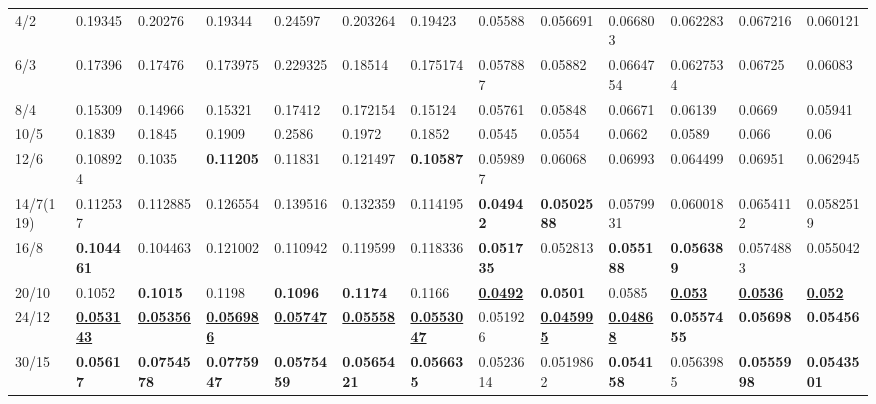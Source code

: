 \begin{landscape}
\begin{table}[]
{\begin{tabular}{@{}lllllllllllll@{}}
4/2 & 0.19345 & 0.20276 & 0.19344 & 0.24597 & 0.203264 & 0.19423 & 0.05588 & 0.056691 & 0.066803 & 0.062283 & 0.067216 & 0.060121 \\
6/3 & 0.17396 & 0.17476 & 0.173975 & 0.229325 & 0.18514 & 0.175174 & 0.057887 & 0.05882 & 0.0664754 & 0.0627534 & 0.06725 & 0.06083 \\
8/4 & 0.15309 & 0.14966 & 0.15321 & 0.17412 & 0.172154 & 0.15124 & 0.05761 & 0.05848 & 0.06671 & 0.06139 & 0.0669 & 0.05941 \\
10/5 & 0.1839 & 0.1845 & 0.1909 & 0.2586 & 0.1972 & 0.1852 & 0.0545 & 0.0554 & 0.0662 & 0.0589 & 0.066 & 0.06 \\
12/6 & 0.108924 & 0.1035 & {\color[HTML]{34FF34} \textbf{0.11205}} & 0.11831 & 0.121497 & {\color[HTML]{34FF34} \textbf{0.10587}} & 0.059897 & 0.06068 & 0.06993 & 0.064499 & 0.06951 & 0.062945 \\
14/7(119\textendash0) & 0.112537 & 0.112885 & 0.126554 & 0.139516 & 0.132359 & 0.114195 & {\color[HTML]{32CB00} \textbf{0.04942}} & {\color[HTML]{34FF34} \textbf{0.0502588}} & 0.0579931 & 0.060018 & 0.0654112 & 0.0582519 \\
16/8 & {\color[HTML]{34FF34} \textbf{0.104461}} & 0.104463 & 0.121002 & 0.110942 & 0.119599 & 0.118336 & {\color[HTML]{34FF34} \textbf{0.051735}} & 0.052813 & {\color[HTML]{34FF34} \textbf{0.055188}} & {\color[HTML]{34FF34} \textbf{0.056389}} & 0.0574883 & 0.055042 \\
20/10 & 0.1052 & {\color[HTML]{34FF34} \textbf{0.1015}} & 0.1198 & {\color[HTML]{34FF34} \textbf{0.1096}} & {\color[HTML]{34FF34} \textbf{0.1174}} & 0.1166 & {\color[HTML]{009901} {\ul\textbf{0.0492}}} & {\color[HTML]{32CB00} \textbf{0.0501}} & 0.0585 & {\color[HTML]{009901} {\ul\textbf{0.053}}} & {\color[HTML]{009901} {\ul\textbf{0.0536}}} & {\color[HTML]{009901} {\ul\textbf{0.052}}} \\
24/12 & {\color[HTML]{009901} {\ul\textbf{0.053143}}} & {\color[HTML]{009901} {\ul\textbf{0.05356}}} & {\color[HTML]{009901} {\ul\textbf{0.056986}}} & {\color[HTML]{009901} {\ul\textbf{0.05747}}} & {\color[HTML]{009901} {\ul\textbf{0.05558}}} & {\color[HTML]{009901} {\ul\textbf{0.0553047}}} & 0.051926 & {\color[HTML]{009901} {\ul\textbf{0.045995}}} & {\color[HTML]{009901} {\ul\textbf{0.04868}}} & {\color[HTML]{32CB00} \textbf{0.0557455}} & {\color[HTML]{34FF34} \textbf{0.05698}} & {\color[HTML]{34FF34} \textbf{0.05456}} \\
30/15 & {\color[HTML]{32CB00} \textbf{0.05617}} & {\color[HTML]{32CB00} \textbf{0.0754578}} & {\color[HTML]{32CB00} \textbf{0.0775947}} & {\color[HTML]{32CB00} \textbf{0.0575459}} & {\color[HTML]{32CB00} \textbf{0.0565421}} & {\color[HTML]{32CB00} \textbf{0.056635}} & 0.0523614 & 0.0519862 & {\color[HTML]{32CB00} \textbf{0.054158}} & 0.0563985 & {\color[HTML]{32CB00} \textbf{0.0555998}} & {\color[HTML]{32CB00} \textbf{0.0543501}} \\ \midrule

\end{tabular}}
\end{table}
\end{landscape}
